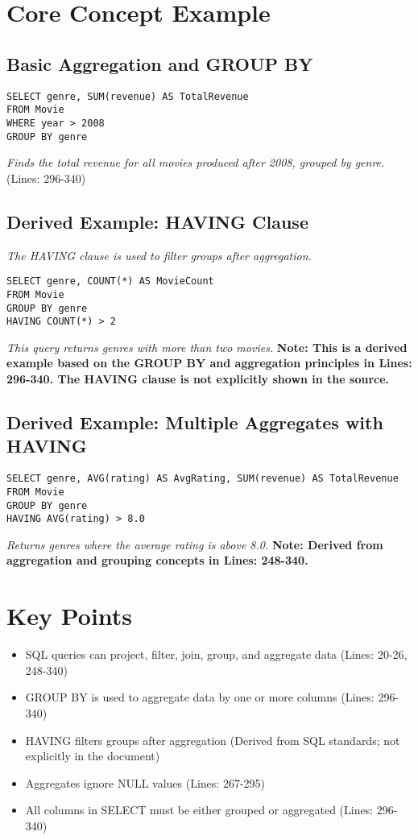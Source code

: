 \documentclass{article}
\begin{document}
\section*{Core Concept Example}

\subsection*{Basic Aggregation and GROUP BY}
\begin{verbatim}
SELECT genre, SUM(revenue) AS TotalRevenue
FROM Movie
WHERE year > 2008
GROUP BY genre
\end{verbatim}
\textit{Finds the total revenue for all movies produced after 2008, grouped by genre.} (Lines: 296-340)

\subsection*{Derived Example: HAVING Clause}
\textit{The HAVING clause is used to filter groups after aggregation.}
\begin{verbatim}
SELECT genre, COUNT(*) AS MovieCount
FROM Movie
GROUP BY genre
HAVING COUNT(*) > 2
\end{verbatim}
\textit{This query returns genres with more than two movies.}
\textbf{Note: This is a derived example based on the GROUP BY and aggregation principles in Lines: 296-340. The HAVING clause is not explicitly shown in the source.}

\subsection*{Derived Example: Multiple Aggregates with HAVING}
\begin{verbatim}
SELECT genre, AVG(rating) AS AvgRating, SUM(revenue) AS TotalRevenue
FROM Movie
GROUP BY genre
HAVING AVG(rating) > 8.0
\end{verbatim}
\textit{Returns genres where the average rating is above 8.0.}
\textbf{Note: Derived from aggregation and grouping concepts in Lines: 248-340.}

\section*{Key Points}
\begin{itemize}
    \item SQL queries can project, filter, join, group, and aggregate data (Lines: 20-26, 248-340)
    \item GROUP BY is used to aggregate data by one or more columns (Lines: 296-340)
    \item HAVING filters groups after aggregation (Derived from SQL standards; not explicitly in the document)
    \item Aggregates ignore NULL values (Lines: 267-295)
    \item All columns in SELECT must be either grouped or aggregated (Lines: 296-340)
\end{itemize}
\end{document}
